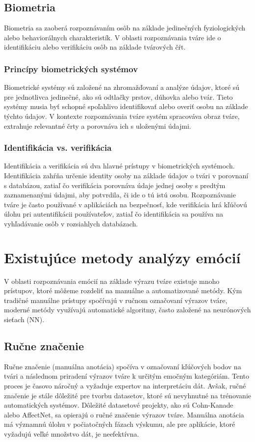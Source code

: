 \subsection{Biometria}
Biometria sa zaoberá rozpoznávaním osôb na základe jedinečných fyziologických alebo behaviorálnych charakteristík. V oblasti rozpoznávania tváre ide o identifikáciu alebo verifikáciu osôb na základe tvárových čŕt​. \cite{8614755} \cite{9674818}
\subsubsection{Princípy biometrických systémov}
Biometrické systémy sú založené na zhromažďovaní a analýze údajov, ktoré sú pre jednotlivca jedinečné, ako sú odtlačky prstov, dúhovka alebo tvár. Tieto systémy musia byť schopné spoľahlivo identifikovať alebo overiť osobu na základe týchto údajov. V kontexte rozpoznávania tváre systém spracováva obraz tváre, extrahuje relevantné črty a porovnáva ich s uloženými údajmi​. \cite{CANAL2022593}
\subsubsection{Identifikácia vs. verifikácia}
Identifikácia a verifikácia sú dva hlavné prístupy v biometrických systémoch. Identifikácia zahŕňa určenie identity osoby na základe údajov o tvári v porovnaní s databázou, zatiaľ čo verifikácia porovnáva údaje jednej osoby s predtým zaznamenanými údajmi, aby potvrdila, či ide o tú istú osobu​\cite{8614755}. Rozpoznávanie tváre je často používané v aplikáciách na bezpečnosť, kde verifikácia hrá kľúčovú úlohu pri autentifikácii používateľov, zatiaľ čo identifikácia sa používa na vyhľadávanie osôb v rozsiahlych databázach.\cite{9674818}

\section{Existujúce metody analýzy emócií}
V oblasti rozpoznávania emócií na základe výrazu tváre existuje mnoho prístupov, ktoré môžeme rozdeliť na manuálne a automatizované metódy. Kým tradičné manuálne prístupy spočívajú v ručnom označovaní výrazov tváre, moderné metódy využívajú automatické algoritmy, často založené na neurónových sieťach (NN).
\subsection{Ručne značenie}
Ručne značenie (manuálna anotácia) spočíva v označovaní kľúčových bodov na tvári a následnom priradení výrazov tváre k určitým emočným kategóriám. Tento proces je časovo náročný a vyžaduje expertov na interpretáciu dát. Avšak, ručné značenie je stále dôležité pre tvorbu datasetov, ktoré sú nevyhnutné na trénovanie automatických systémov. Dôležité datasetové projekty, ako sú Cohn-Kanade alebo AffectNet, sa opierajú o ručné značenie výrazov tváre​. Manuálna anotácia má významnú úlohu v počiatočných fázach výskumu, ale pre aplikácie, ktoré vyžadujú veľké množstvo dát, je neefektívna. \cite{CANAL2022593}
